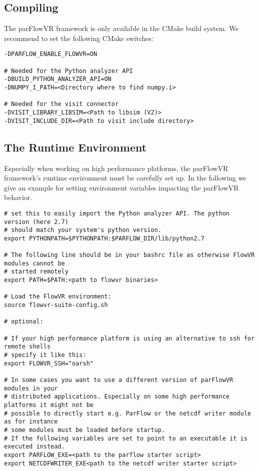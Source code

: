 \subsection{Compiling}
The parFlowVR framework is only available in the CMake build system. We recommend to set the following
CMake switches:
\begin{display}\begin{verbatim}
-DPARFLOW_ENABLE_FLOWVR=ON

# Needed for the Python analyzer API
-DBUILD_PYTHON_ANALYZER_API=ON
-DNUMPY_I_PATH=<Directory where to find numpy.i>

# Needed for the visit connector
-DVISIT_LIBRARY_LIBSIM=<Path to libsim (V2)>
-DVISIT_INCLUDE_DIR=<Path to visit include directory>
\end{verbatim}\end{display}

\subsection{The Runtime Environment}
Especially when working on high performance platforms, the parFlowVR framework's runtime
environment must be carefully set up.
In the following we give an example for setting environment variables impacting the
parFlowVR behavior.
\begin{display}\begin{verbatim}
# set this to easily import the Python analyzer API. The python version (here 2.7)
# should match your system's python version.
export PYTHONPATH=$PYTHONPATH:$PARFLOW_DIR/lib/python2.7

# The following line should be in your bashrc file as otherwise FlowVR modules cannot be
# started remotely
export PATH=$PATH:<path to flowvr binaries>

# Load the FlowVR environment:
source flowvr-suite-config.sh

# optional:

# If your high performance platform is using an alternative to ssh for remote shells
# specify it like this:
export FLOWVR_SSH="oarsh"

# In some cases you want to use a different version of parFlowVR modules in your
# distributed applications. Especially on some high performance platforms it might not be
# possible to directly start e.g. ParFlow or the netcdf writer module as for instance
# some modules must be loaded before startup.
# If the following variables are set to point to an executable it is executed instead.
export PARFLOW_EXE=<path to the parflow starter script>
export NETCDFWRITER_EXE<path to the netcdf writer starter script>
\end{verbatim}\end{display}

